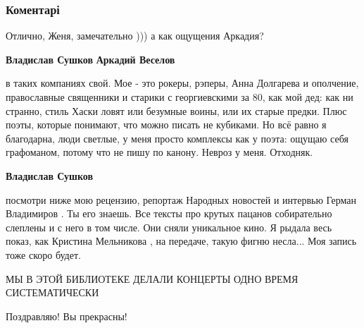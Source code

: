  
 
 
 
 
\subsubsection{Коментарі}

\begin{itemize} %
Отлично, Женя, замечательно ))) а как ощущения Аркадия?

\begin{itemize} %
\textbf{Владислав Сушков} \textbf{Аркадий Веселов} 

в таких компаниях свой. Мое - это рокеры, рэперы, Анна Долгарева и ополчение,
православные священники и старики с георгиевскими за 80, как мой дед: как ни
странно, стиль Хаски ловят или безумные воины, или их старые предки. Плюс
поэты, которые понимают, что можно писать не кубиками. Но всё равно я
благодарна, люди светлые, у меня просто комплексы как у поэта: ощущаю себя
графоманом, потому что не пишу по канону. Невроз у меня. Отходняк.

\textbf{Владислав Сушков} 

посмотри ниже мою рецензию, репортаж Народных новостей и интервью Герман
Владимиров . Ты его знаешь. Все тексты про крутых пацанов собирательно слеплены
и с него в том числе. Они сняли уникальное кино. Я рыдала весь показ, как
Кристина Мельникова , на передаче, такую фигню несла... Моя запись тоже скоро
будет.

\end{itemize} %

МЫ В ЭТОЙ БИБЛИОТЕКЕ ДЕЛАЛИ КОНЦЕРТЫ ОДНО ВРЕМЯ СИСТЕМАТИЧЕСКИ

Поздравляю! Вы прекрасны!

\end{itemize} %

